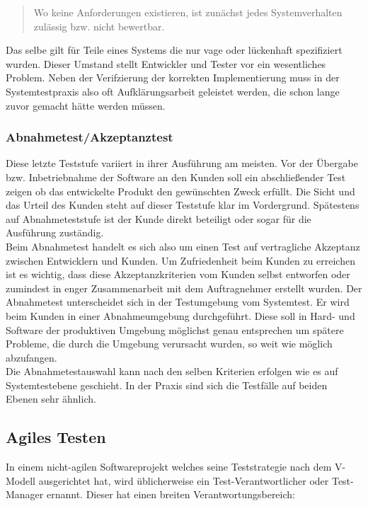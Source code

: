 \begin{quote}
Wo keine Anforderungen existieren, ist zunächst jedes Systemverhalten zulässig bzw. nicht bewertbar\cite{spillner_basiswissen_2012}.
\end{quote}
Das selbe gilt für Teile eines Systems die nur vage oder lückenhaft spezifiziert wurden. Dieser Umstand stellt Entwickler und Tester vor ein wesentliches Problem. Neben der Verifzierung der korrekten Implementierung muss in der Systemtestpraxis also oft Aufklärungsarbeit geleistet werden, die schon lange zuvor gemacht hätte werden müssen.

\subsubsection{Abnahmetest/Akzeptanztest}
Diese letzte Teststufe variiert in ihrer Ausführung am meisten. Vor der Übergabe bzw. Inbetriebnahme der Software an den Kunden soll ein abschließender Test zeigen ob das entwickelte Produkt den gewünschten Zweck erfüllt. Die Sicht und das Urteil des Kunden steht auf dieser Teststufe klar im Vordergrund. Spätestens auf Abnahmeteststufe ist der Kunde direkt beteiligt oder sogar für die Ausführung zuständig.\\
Beim Abnahmetest handelt es sich also um einen Test auf vertragliche Akzeptanz zwischen Entwicklern und Kunden. Um Zufriedenheit beim Kunden zu erreichen ist es wichtig, dass diese Akzeptanzkriterien vom Kunden selbst entworfen oder zumindest in enger Zusammenarbeit mit dem Auftragnehmer erstellt wurden\cite{spillner_basiswissen_2012}. Der Abnahmetest unterscheidet sich in der Testumgebung vom Systemtest. Er wird beim Kunden in einer Abnahmeumgebung durchgeführt. Diese soll in Hard- und Software der produktiven Umgebung möglichst genau entsprechen um spätere Probleme, die durch die Umgebung verursacht wurden, so weit wie möglich abzufangen.\\
Die Abnahmetestauswahl kann nach den selben Kriterien erfolgen wie es auf Systemtestebene geschieht. In der Praxis sind sich die Testfälle auf beiden Ebenen sehr ähnlich.

\subsection{Agiles Testen}
In einem nicht-agilen Softwareprojekt welches seine Teststrategie nach dem V-Modell ausgerichtet hat, wird üblicherweise ein Test-Verantwortlicher oder Test-Manager ernannt. Dieser hat einen breiten Verantwortungsbereich\cite{linz_testing_2014}:

